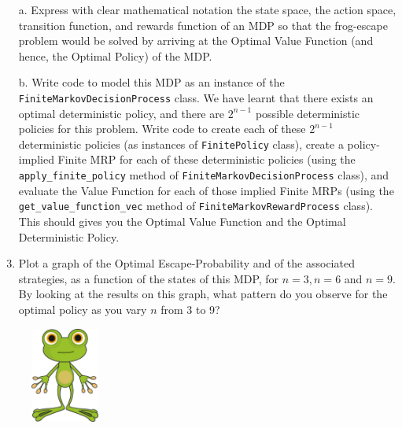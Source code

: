 \documentclass[12pt]{exam}
\begin{document}
\begin{questions}
\begin{enumerate}
	\item[a.] Express with clear mathematical notation the state space, the action space, transition function, and rewards function of an MDP so that the frog-escape problem would be solved by arriving at the Optimal Value Function (and hence, the Optimal Policy) of the MDP.
	\item[b.] Write code to model this MDP as an instance of the \lstinline{FiniteMarkovDecisionProcess} class. We have learnt that there exists an optimal deterministic policy, and there are $2^{n-1}$ possible deterministic policies for this problem. Write code to create each of these $2^{n-1}$ deterministic policies (as instances of \lstinline{FinitePolicy} class), create a policy-implied Finite MRP for each of these deterministic policies (using the \lstinline{apply_finite_policy} method of \lstinline{FiniteMarkovDecisionProcess} class), and evaluate the Value Function for each of those implied Finite MRPs (using the \lstinline{get_value_function_vec} method of \lstinline{FiniteMarkovRewardProcess} class). This should gives you the Optimal Value Function and the Optimal Deterministic Policy.
	\item[c.] Plot a graph of the Optimal Escape-Probability and of the associated strategies, as a function of the states of this MDP, for $n=3, n=6$ and $n=9$. By looking at the results on this graph, what pattern do you observe for the optimal policy as you vary $n$ from 3 to 9? 
\end{enumerate}

\end{questions}

\begin{figure}[t]
	\begin{center}
		\includegraphics[width=0.2\textwidth]{Figures/2_frog.png}
	\end{center}
\end{figure}
\end{document}
